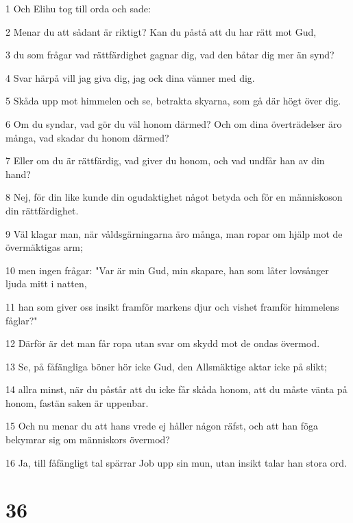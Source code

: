 \par 1 Och Elihu tog till orda och sade:
\par 2 Menar du att sådant är riktigt? Kan du påstå att du har rätt mot Gud,
\par 3 du som frågar vad rättfärdighet gagnar dig, vad den båtar dig mer än synd?
\par 4 Svar härpå vill jag giva dig, jag ock dina vänner med dig.
\par 5 Skåda upp mot himmelen och se, betrakta skyarna, som gå där högt över dig.
\par 6 Om du syndar, vad gör du väl honom därmed? Och om dina överträdelser äro många, vad skadar du honom därmed?
\par 7 Eller om du är rättfärdig, vad giver du honom, och vad undfår han av din hand?
\par 8 Nej, för din like kunde din ogudaktighet något betyda och för en människoson din rättfärdighet.
\par 9 Väl klagar man, när våldsgärningarna äro många, man ropar om hjälp mot de övermäktigas arm;
\par 10 men ingen frågar: "Var är min Gud, min skapare, han som låter lovsånger ljuda mitt i natten,
\par 11 han som giver oss insikt framför markens djur och vishet framför himmelens fåglar?"
\par 12 Därför är det man får ropa utan svar om skydd mot de ondas övermod.
\par 13 Se, på fåfängliga böner hör icke Gud, den Allsmäktige aktar icke på slikt;
\par 14 allra minst, när du påstår att du icke får skåda honom, att du måste vänta på honom, fastän saken är uppenbar.
\par 15 Och nu menar du att hans vrede ej håller någon räfst, och att han föga bekymrar sig om människors övermod?
\par 16 Ja, till fåfängligt tal spärrar Job upp sin mun, utan insikt talar han stora ord.

\chapter{36}

